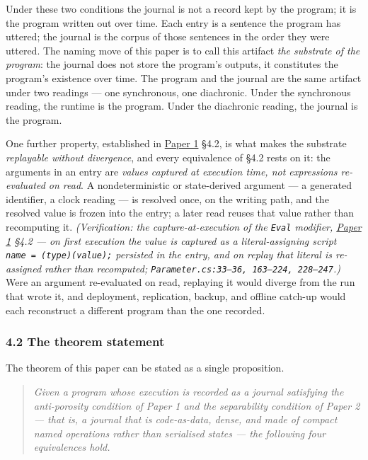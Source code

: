 \documentclass[
]{article}
\begin{document}
Under these two conditions the journal is not a record kept by the
program; it is the program written out over time. Each entry is a
sentence the program has uttered; the journal is the corpus of those
sentences in the order they were uttered. The naming move of this paper
is to call this artifact \emph{the substrate of the program}: the
journal does not store the program's outputs, it constitutes the
program's existence over time. The program and the journal are the same
artifact under two readings --- one synchronous, one diachronic. Under
the synchronous reading, the runtime is the program. Under the
diachronic reading, the journal is the program.

One further property, established in \href{01-anti-porosity.md}{Paper 1}
§4.2, is what makes the substrate \emph{replayable without divergence},
and every equivalence of §4.2 rests on it: the arguments in an entry are
\emph{values captured at execution time, not expressions re-evaluated on
read}. A nondeterministic or state-derived argument --- a generated
identifier, a clock reading --- is resolved once, on the writing path,
and the resolved value is frozen into the entry; a later read reuses
that value rather than recomputing it. \emph{(Verification: the
capture-at-execution of the \texttt{Eval} modifier,
\href{01-anti-porosity.md}{Paper 1} §4.2 --- on first execution the
value is captured as a literal-assigning script
\texttt{name\ =\ (type)(value);} persisted in the entry, and on replay
that literal is re-assigned rather than recomputed;
\texttt{Parameter.cs:33–36,\ 163–224,\ 228–247}.)} Were an argument
re-evaluated on read, replaying it would diverge from the run that wrote
it, and deployment, replication, backup, and offline catch-up would each
reconstruct a different program than the one recorded.

\subsubsection{4.2 The theorem statement}\label{the-theorem-statement}

The theorem of this paper can be stated as a single proposition.

\begin{quote}
\emph{Given a program whose execution is recorded as a journal
satisfying the anti-porosity condition of Paper 1 and the separability
condition of Paper 2 --- that is, a journal that is code-as-data, dense,
and made of compact named operations rather than serialised states ---
the following four equivalences hold.}
\end{quote}
\end{document}
